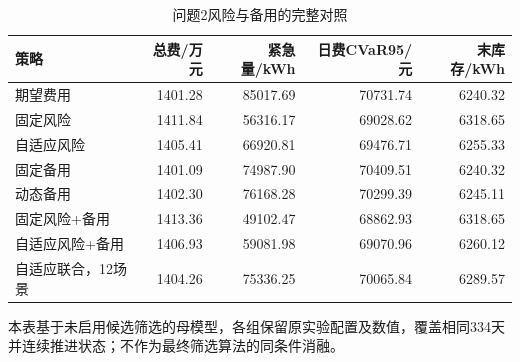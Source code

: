 \begin{table}[htbp]\centering\small
\caption{问题2风险与备用的完整对照}
\label{tab:v2_risk_modules}
\begin{tabularx}{\linewidth}{LRRRR}\toprule
策略 & 总费/万元 & 紧急量/kWh & 日费CVaR95/元 & 末库存/kWh\\\midrule
期望费用 & 1401.28 & 85017.69 & 70731.74 & 6240.32\\
固定风险 & 1411.84 & 56316.17 & 69028.62 & 6318.65\\
自适应风险 & 1405.41 & 66920.81 & 69476.71 & 6255.33\\
固定备用 & 1401.09 & 74987.90 & 70409.51 & 6240.32\\
动态备用 & 1402.30 & 76168.28 & 70299.39 & 6245.11\\
固定风险+备用 & 1413.36 & 49102.47 & 68862.93 & 6318.65\\
自适应风险+备用 & 1406.93 & 59081.98 & 69070.96 & 6260.12\\
自适应联合，12场景 & 1404.26 & 75336.25 & 70065.84 & 6289.57\\
\bottomrule\end{tabularx}
\par\smallskip\parbox{\linewidth}{\footnotesize 本表基于未启用候选筛选的母模型，各组保留原实验配置及数值，覆盖相同334天并连续推进状态；不作为最终筛选算法的同条件消融。}
\end{table}
